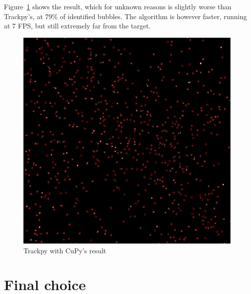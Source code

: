 Figure~\ref{fig:locate:trackpy-cupy} shows the result, which for unknown reasons is slightly worse than Trackpy's, at 79\% of identified bubbles.
The algorithm is however faster, running at 7 FPS, but still extremely far from the target.

\begin{figure}
	\centerline{\includegraphics[width=\locateimgsize]{images/locate/cuda-trackpy.png}}
	\caption{\centering Trackpy with CuPy's result}
	\label{fig:locate:trackpy-cupy}
\end{figure}


\section{Final choice}
